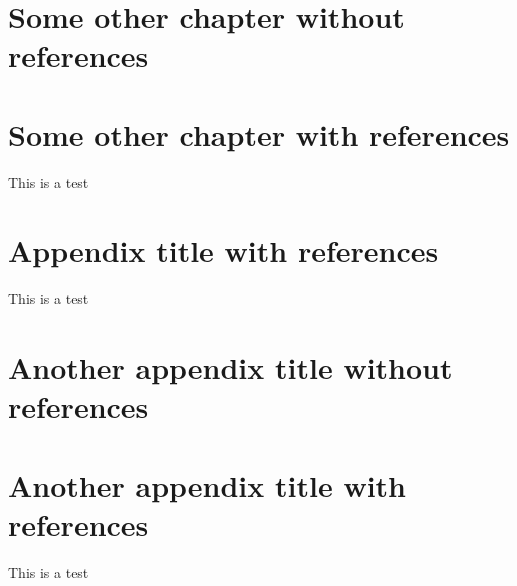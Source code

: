 \documentclass[
documentsize = octavo, %
printmode = true, %
font = cmr, %
typesize = 10, %
fontsize = normalsize, %
onehalfspacing = false, %
language = en, %
degree = phd, %
titlelogo = udc, %
titlepage = true, %
dedication = true, %
preface = true, %
acknowledgements = true, %
abstract-en = true, %
abstract-es = true, %
abstract-ga = true, %
epigraphs = true, %
toc = true, %
lof = true, %
lot = true, %
notation = true, %
biblatex-globalbib = true, %
biblatex-chapterbib = true, %
frontmatterintoc = true, %
printby = true, %
debug = false, %
draft = false, %
showlayout = false, %
]{UDCthesis}
\begin{document}


\chapter{Some other chapter without references}

\blindtext[3]

\chapter{Some other chapter with references}

This is a test \citep{Oetiker2020,Oetiker2021,Oetiker2022,Oetiker2023,Oetiker2024}

\blindtext[5]

\appendix

\chapter{Appendix title with references}
This is a test \citep{Oetiker2020,Oetiker2021,Oetiker2022,Oetiker2023,Oetiker2024}

\blindtext[5]

\chapter{Another appendix title without references}

\blindtext[10]

\chapter{Another appendix title with references}
This is a test \citep{Oetiker2020,Oetiker2021,Oetiker2022,Oetiker2023,Oetiker2024}

\blindtext[5]
\end{document}
